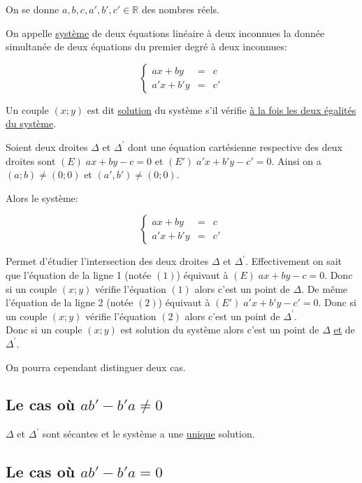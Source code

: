\documentclass[french]{book}
\begin{document}
On se donne $a,b,c,a',b',c' \in \mathbb{R}$ des nombres réels.

\begin{defn}
On appelle \underline{système} de deux équations linéaire à deux inconnues la donnée simultanée de deux équations du premier degré à deux inconnues: 

$$
\left \{
\begin{array}{rcl}
ax+by&=&c \\
a'x+b'y&=&c'
\end{array}
\right. 
$$

Un couple $(x;y)$ est dit \underline{solution} du système s'il vérifie \underline{à la fois les deux égalités du système}.

\end{defn}

Soient deux droites $\Delta$ et $\Delta^{'}$ dont une équation cartésienne respective des deux droites sont $(E)\; ax+by-c=0$ et $(E')\; a'x+b'y-c'=0$. Ainsi on a $(a;b) \neq (0;0)$ et $(a',b') \neq (0;0)$.

Alors le système: 

$$
\left \{
\begin{array}{rcl}
ax+by&=&c \\
a'x+b'y&=&c'
\end{array}
\right. 
$$ 

Permet d'étudier l'intersection des deux droites  $\Delta$ et $\Delta^{'}$. 
Effectivement on sait que l'équation de la ligne 1 (notée $(1)$) équivaut à $(E)\; ax+by-c=0$. Donc si un couple $(x;y)$ vérifie l'équation $(1)$ alors c'est un point de $\Delta$. De même l'équation de la ligne 2 (notée $(2)$) équivaut à  $(E')\; a'x+b'y-c'=0$. Donc si un couple $(x;y)$ vérifie l'équation $(2)$ alors c'est un point de $\Delta^{'}$. \\

Donc si un couple $(x;y)$ est solution du système alors c'est un point de $\Delta$ \underline{et} de $\Delta^{'}$.

On pourra cependant distinguer deux cas.

\subsection*{Le cas où $ ab'-b'a \neq 0$}
$\Delta$ et $\Delta^{'}$ sont sécantes et le système a une \underline{unique} solution.
\subsection*{Le cas où $ ab'-b'a = 0$}
\end{document}
